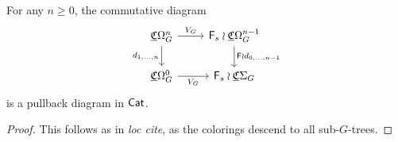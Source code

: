 \documentclass[a4paper,10pt
]{article}%
\newcommand{\UC}{\underline{\mathfrak C}}
\renewcommand{\1}{\ensuremath{\mathbb{id}}}
\begin{document}
\begin{proposition}[{cf. \cite[Prop 3.82]{BP17}}]
      For any $n \geq 0$, the commutative diagram
      \begin{equation}
            \begin{tikzcd}
                  \UC\Omega_G^n \arrow[d, "d_{1,\dots,n}"'] \arrow[r, "V_G"]
                  &
                  \mathsf F_s \wr \UC\Omega_G^{n-1} \arrow[d, "\mathsf F \wr d_{0,\dots,n-1}"]
                  \\
                  \UC\Omega_G^0 \arrow[r, "V_G"']
                  &
                  \mathsf F_s \wr \UC\Sigma_G
            \end{tikzcd}
      \end{equation}
      is a pullback diagram in $\mathsf{Cat}$.
\end{proposition}
\begin{proof}
      This follows as in \textit{loc cite}, as the colorings descend to all sub-$G$-trees.
\end{proof}

\end{document}
